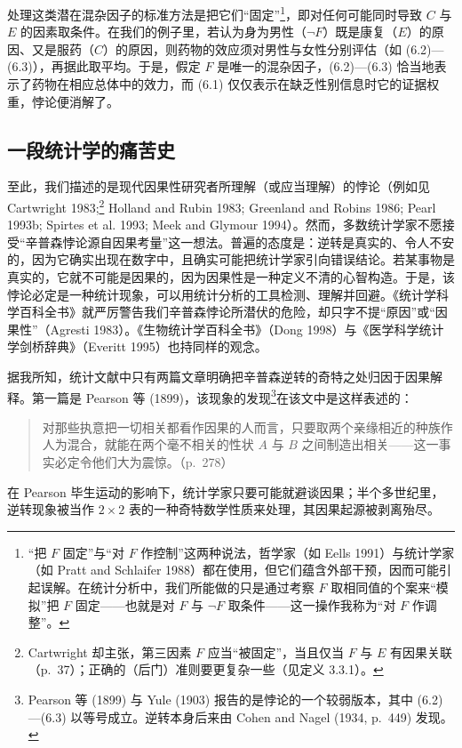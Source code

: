 处理这类潜在混杂因子的标准方法是把它们“固定”\footnote{“把 $F$ 固定”与“对 $F$ 作控制”这两种说法，哲学家（如 Eells 1991）与统计学家（如 Pratt and Schlaifer 1988）都在使用，但它们蕴含外部干预，因而可能引起误解。在统计分析中，我们所能做的只是通过考察 $F$ 取相同值的个案来“模拟”把 $F$ 固定——也就是对 $F$ 与 $\neg F$ 取条件——这一操作我称为“对 $F$ 作调整”。}，即对任何可能同时导致 $C$ 与 $E$ 的因素取条件。在我们的例子里，若认为身为男性（$\neg F$）既是康复（$E$）的原因、又是服药（$C$）的原因，则药物的效应须对男性与女性分别评估（如 \textup{(6.2)}—\textup{(6.3)}），再据此取平均。于是，假定 $F$ 是唯一的混杂因子，\textup{(6.2)}—\textup{(6.3)} 恰当地表示了药物在相应总体中的效力，而 \textup{(6.1)} 仅仅表示在缺乏性别信息时它的证据权重，悖论便消解了。

\subsection{一段统计学的痛苦史}

至此，我们描述的是现代因果性研究者所理解（或应当理解）的悖论（例如见 Cartwright 1983;\footnote{Cartwright 却主张，第三因素 $F$ 应当“被固定”，当且仅当 $F$ 与 $E$ 有因果关联（p.~37）；正确的（后门）准则要更复杂一些（见定义 3.3.1）。} Holland and Rubin 1983; Greenland and Robins 1986; Pearl 1993b; Spirtes et al. 1993; Meek and Glymour 1994）。然而，多数统计学家不愿接受“辛普森悖论源自因果考量”这一想法。普遍的态度是：逆转是真实的、令人不安的，因为它确实出现在数字中，且确实可能把统计学家引向错误结论。若某事物是真实的，它就不可能是因果的，因为因果性是一种定义不清的心智构造。于是，该悖论必定是一种统计现象，可以用统计分析的工具检测、理解并回避。《统计学科学百科全书》就严厉警告我们辛普森悖论所潜伏的危险，却只字不提“原因”或“因果性”（Agresti 1983）。《生物统计学百科全书》（Dong 1998）与《医学科学统计学剑桥辞典》（Everitt 1995）也持同样的观念。

据我所知，统计文献中只有两篇文章明确把辛普森逆转的奇特之处归因于因果解释。第一篇是 Pearson 等 (1899)，该现象的发现\footnote{Pearson 等 (1899) 与 Yule (1903) 报告的是悖论的一个较弱版本，其中 \textup{(6.2)}—\textup{(6.3)} 以等号成立。逆转本身后来由 Cohen and Nagel (1934, p.~449) 发现。}在该文中是这样表述的：

\begin{quote}
\kaishu
对那些执意把一切相关都看作因果的人而言，只要取两个亲缘相近的种族作人为混合，就能在两个毫不相关的性状 $A$ 与 $B$ 之间制造出相关——这一事实必定令他们大为震惊。（p.~278）
\end{quote}

在 Pearson 毕生运动的影响下，统计学家只要可能就避谈因果；半个多世纪里，逆转现象被当作 $2\times 2$ 表的一种奇特数学性质来处理，其因果起源被剥离殆尽。

